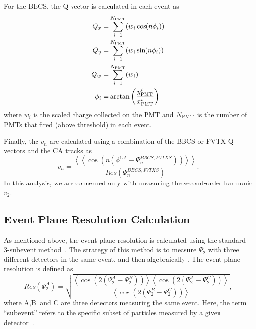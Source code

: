 For the BBCS, the Q-vector is calculated in each event as
\begin{align}
Q_x &= \sum^{N_{\rm PMT}}_{i=1}( w_i \cos(n\phi_i)) \\
Q_y &= \sum^{N_{\rm PMT}}_{i=1}( w_i \sin(n\phi_i)) \\
Q_w &= \sum^{N_{\rm PMT}}_{i=1}( w_i ) \\
\phi_i &= \arctan\left(\frac{y^i_{\rm PMT}}{x^i_{\rm PMT}}\right) 
\label{eqn:bbc_ep_eqns}
\end{align}
where $w_i$ is the scaled charge collected on the PMT and $N_{\rm PMT}$ is the number of PMTs that fired (above threshold) in each event.

Finally, the $v_n$ are calculated using a combination of the BBCS or FVTX Q-vectors and the CA tracks as
\begin{equation}
v_n = \frac{\left<\left<\cos(n(\phi^{CA} - \Psi^{BBCS,FVTXS}_n))\right>\right>}{Res(\Psi^{BBCS,FVTXS}_n)}.
\end{equation}
In this analysis, we are concerned only with measuring the second-order harmonic $v_2$.

\subsection{Event Plane Resolution Calculation}%
As mentioned above, the event plane resolution is calculated using the standard 3-subevent method~\cite{PhysRevC.58.1671}. The strategy of this method is to measure $\Psi_2$ with three different detectors in the same event, and then algebraically . The event plane resolution is defined as
\begin{equation}
Res(\Psi_2^A) = \sqrt{\frac{\left<\cos(2(\Psi_2^A - \Psi_2^B))\right>\left<\cos(2(\Psi_2^A - \Psi_2^C))\right>}{\left<\cos(2(\Psi_2^B - \Psi_2^C))\right>}},
\label{eqn:res}
\end{equation}
where A,B, and C are three detectors measuring the same event. Here, the term ``subevent'' refers to the specific subset of particles measured by a given detector~\cite{PhysRevC.58.1671}.

